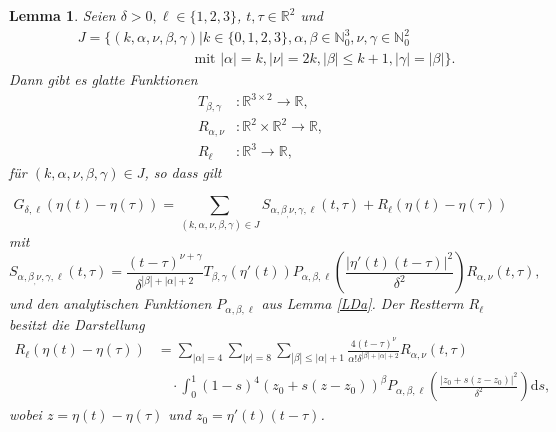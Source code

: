 \documentclass[12pt,a4paper]{scrartcl}
\newtheorem{Lemma}[Satz]{Lemma}
\newcommand{\dd}{\mathrm{d}}
\numberwithin{equation}{section}
\newcommand{\R}{\mathbb{R}} %
\newcommand{\N}{\mathbb{N}} %
\begin{document}
\begin{Lemma} \label{LGdeltaTaylor}
Seien $\delta>0, \ell \in \{1,2,3\}$, $t,\tau \in \R^2$ und 
\begin{align*}
&J=\{(k,\alpha,\nu,\beta,\gamma)|k\in \{0,1,2,3\}, \alpha , \beta \in \N_0^3, \nu,\gamma \in \N_0^2\\
&\qquad \qquad \qquad \qquad \textrm{ mit } |\alpha|=k, |\nu|=2k, |\beta| \leq k+1, |\gamma|=|\beta|\}.
\end{align*}
Dann gibt es glatte Funktionen 
\begin{align*}
T_{\beta,\gamma}&: \R^{3 \times 2} \to \R,\\
R_{\alpha,\nu}&:\R^2 \times \R^2 \to \R, \\
R_\ell&: \R^3 \to \R,
\end{align*} 
für $(k,\alpha,\nu,\beta,\gamma)\in J$, so dass gilt

\[
	G_{\delta,\ell}(\eta(t)-\eta(\tau)) = \sum_{(k,\alpha,\nu,\beta,\gamma)\in J} S_{\alpha,\beta_,\nu,\gamma,\ell}(t,\tau) + R_\ell(\eta(t)-\eta(\tau))
\]
mit 
\[
S_{\alpha,\beta_,\nu,\gamma,\ell}(t,\tau) = \frac{(t-\tau)^{\nu+\gamma}}{\delta^{|\beta|+|\alpha|+2}}T_{\beta,\gamma}(\eta'(t))P_{\alpha,\beta,\ell} \left(\frac{| \eta'(t)(t-\tau)|^2}{\delta^2}\right)R_{\alpha,\nu}(t,\tau),
\]
 und den analytischen Funktionen $P_{\alpha,\beta,\ell}$ aus Lemma \ref{LDa}.
Der Restterm $R_\ell$ besitzt die Darstellung
\begin{align*}
R_\ell(\eta(t)-\eta(\tau))&= \sum_{|\alpha|=4}\sum_{|\nu|=8}\sum_{|\beta|\leq |\alpha|+1}\frac{4 (t-\tau)^\nu  }{\alpha! \delta^{|\beta|+|\alpha|+2}}R_{\alpha,\nu}(t,\tau) \\
 & \quad  \cdot \int_0^1(1-s)^4  (z_0+s(z-z_0))^\beta P_{\alpha,\beta,\ell} \left(\frac{|z_0+s(z-z_0)|^2}{\delta^2}\right)  \dd s,
\end{align*}
wobei $z=\eta(t)-\eta(\tau)$ und $z_0=\eta'(t)(t-\tau)$.
\end{Lemma}
\end{document}
